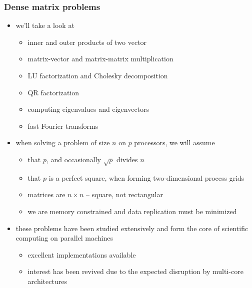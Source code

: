 %
%
%
%


\begin{frame}[fragile]
%
  \frametitle{Dense matrix problems}
%
  \begin{itemize}
%
  \item we'll take a look at
    \begin{itemize}
    \item inner and outer products of two vector
    \item matrix-vector and matrix-matrix multiplication
    \item LU factorization and Cholesky decomposition
    \item QR factorization
    \item computing eigenvalues and eigenvectors
    \item fast Fourier transforms
    \end{itemize}
%
  \item when solving a problem of size $n$ on $p$ processors, we will assume
    \begin{itemize}
    \item that $p$, and occasionally $\sqrt{p}$ divides $n$
    \item that $p$ is a perfect square, when forming two-dimensional process grids
    \item matrices are $n\times n$ -- square, not rectangular
    \item we are memory constrained and data replication must be minimized
    \end{itemize}
%
    \item these problems have been studied extensively and form the core of scientific
      computing on parallel machines
      \begin{itemize}
      \item excellent implementations available 
      \item interest has been revived due to the expected disruption by multi-core
        architectures
      \end{itemize}
%
  \end{itemize}
%
\end{frame}


